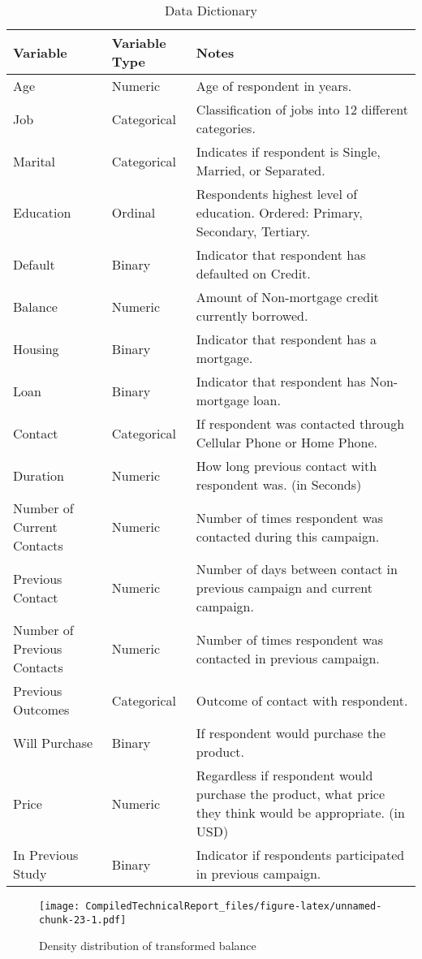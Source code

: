 \documentclass[]{article}
\begin{document}
\begin{table}[h!]
    \centering
    \begin{tabular}{| m{3.2cm} | m{2cm} | m{50mm}|}
    \hline
    \rowcolor{lightgray}
    Variable & Variable Type & Notes \\
    \hline
    Age & Numeric & Age of respondent in years.\\
    \hline
    Job & Categorical & Classification of jobs into 12 different categories.\\
    \hline
    Marital & Categorical & Indicates if respondent is Single, Married, or Separated.\\
    \hline
    Education & Ordinal & Respondents highest level of education. Ordered: Primary, Secondary, Tertiary.\\
    \hline
    Default &Binary& Indicator that respondent has defaulted on Credit.\\
    \hline
    Balance & Numeric & Amount of Non-mortgage credit currently borrowed.\\
    \hline
    Housing & Binary & Indicator that respondent has a mortgage.\\
    \hline
    Loan & Binary & Indicator that respondent has Non-mortgage loan.\\
    \hline
    Contact & Categorical & If respondent was contacted through Cellular Phone or Home Phone.\\
    \hline
    Duration & Numeric & How long previous contact with respondent was. (in Seconds)\\
    \hline
    Number of Current Contacts & Numeric & Number of times respondent was contacted during this campaign.\\
    \hline
    Previous Contact & Numeric & Number of days between contact in previous campaign and current campaign.\\
    \hline
    Number of Previous Contacts & Numeric & Number of times respondent was contacted in previous campaign.\\
    \hline
    Previous Outcomes & Categorical & Outcome of contact with respondent.\\
    \hline
    Will Purchase & Binary & If respondent would purchase the product.\\
    \hline
    Price & Numeric & Regardless if respondent would purchase the product, what price they think would be appropriate. (in USD)\\
    \hline
    In Previous Study & Binary & Indicator if respondents participated in previous campaign. \\
    \hline
    \end{tabular}
    \caption{Data Dictionary}
    \label{tab:my_label}
\end{table}

\begin{figure}
\centering
\texttt{[image: CompiledTechnicalReport\_files/figure-latex/unnamed-chunk-23-1.pdf]}
\caption{Density distribution of transformed balance}
\end{figure}
\end{document}
